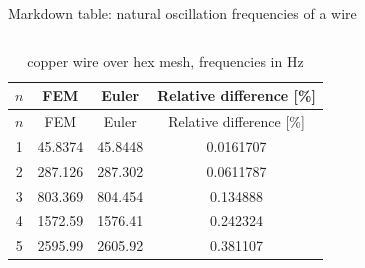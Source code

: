 \documentclass[
  ignorenonframetext,
  aspectratio=169,
]{beamer}
\begin{document}
\begin{frame}[fragile]{Markdown table: natural oscillation frequencies
of a wire}
\begin{columns}[T]
\begin{column}{0.6\textwidth}
\begin{longtable}[]{@{}cccc@{}}
\caption{copper wire over hex mesh, frequencies in Hz}\tabularnewline
\toprule()
\(n\) & FEM & Euler & Relative difference {[}\%{]} \\
\midrule()
\endfirsthead
\toprule()
\(n\) & FEM & Euler & Relative difference {[}\%{]} \\
\midrule()
\endhead
1 & 45.8374 & 45.8448 & 0.0161707 \\
2 & 287.126 & 287.302 & 0.0611787 \\
3 & 803.369 & 804.454 & 0.134888 \\
4 & 1572.59 & 1576.41 & 0.242324 \\
5 & 2595.99 & 2605.92 & 0.381107 \\
\bottomrule()
\end{longtable}
\end{column}
\end{columns}
\end{frame}
\end{document}
